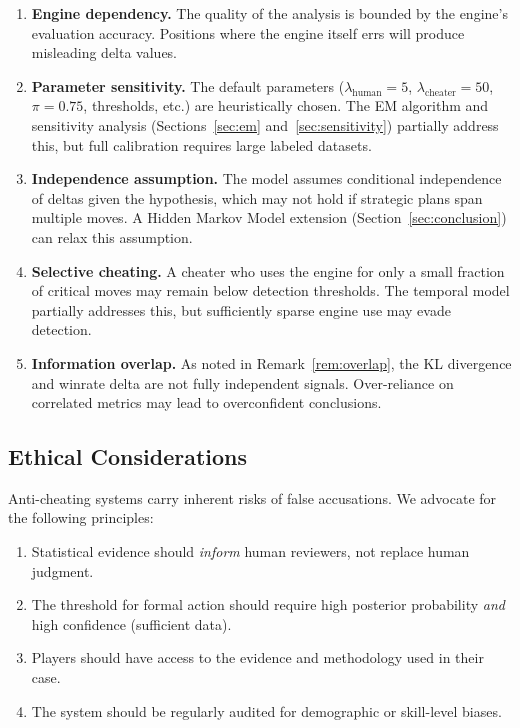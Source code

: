 \documentclass[11pt,a4paper]{article}
\begin{document}
\begin{enumerate}
    \item \textbf{Engine dependency.} The quality of the analysis is bounded by
          the engine's evaluation accuracy. Positions where the engine itself
          errs will produce misleading delta values.
    \item \textbf{Parameter sensitivity.} The default parameters
          ($\lambda_{\text{human}} = 5$, $\lambda_{\text{cheater}} = 50$,
          $\pi = 0.75$, thresholds, etc.) are heuristically chosen. The EM
          algorithm and sensitivity analysis (Sections~\ref{sec:em}
          and~\ref{sec:sensitivity}) partially address this, but full
          calibration requires large labeled datasets.
    \item \textbf{Independence assumption.} The model assumes conditional
          independence of deltas given the hypothesis, which may not hold if
          strategic plans span multiple moves. A Hidden Markov Model
          extension (Section~\ref{sec:conclusion}) can relax this assumption.
    \item \textbf{Selective cheating.} A cheater who uses the engine for only a
          small fraction of critical moves may remain below detection
          thresholds. The temporal model partially addresses this, but
          sufficiently sparse engine use may evade detection.
    \item \textbf{Information overlap.} As noted in
          Remark~\ref{rem:overlap}, the KL divergence and winrate delta are
          not fully independent signals. Over-reliance on correlated metrics
          may lead to overconfident conclusions.
\end{enumerate}

\subsection{Ethical Considerations}

Anti-cheating systems carry inherent risks of false accusations. We advocate
for the following principles:
\begin{enumerate}
    \item Statistical evidence should \emph{inform} human reviewers, not
          replace human judgment.
    \item The threshold for formal action should require high posterior
          probability \emph{and} high confidence (sufficient data).
    \item Players should have access to the evidence and methodology used in
          their case.
    \item The system should be regularly audited for demographic or
          skill-level biases.
\end{enumerate}
\end{document}
